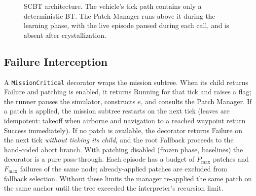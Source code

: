 \documentclass[conference]{IEEEtran}
\begin{document}
\begin{figure}[t]
\caption{SCBT architecture. The vehicle's tick path contains only a deterministic BT. The Patch Manager runs above it during the learning phase, with the live episode paused during each call, and is absent after crystallization.}
\label{fig:arch}
\end{figure}

\subsection{Failure Interception}
A \texttt{MissionCritical} decorator wraps the mission subtree. When its child returns Failure and patching is enabled, it returns Running for that tick and raises a flag; the runner pauses the simulator, constructs $e$, and consults the Patch Manager. If a patch is applied, the mission subtree restarts on the next tick (leaves are idempotent: takeoff when airborne and navigation to a reached waypoint return Success immediately). If no patch is available, the decorator returns Failure on the next tick \emph{without ticking its child}, and the root Fallback proceeds to the hand-coded abort branch. With patching disabled (frozen phase, baselines) the decorator is a pure pass-through. Each episode has a budget of $P_{\max}$ patches and $F_{\max}$ failures of the same node; already-applied patches are excluded from fallback selection. Without these limits the manager re-applied the same patch on the same anchor until the tree exceeded the interpreter's recursion limit.
\end{document}
